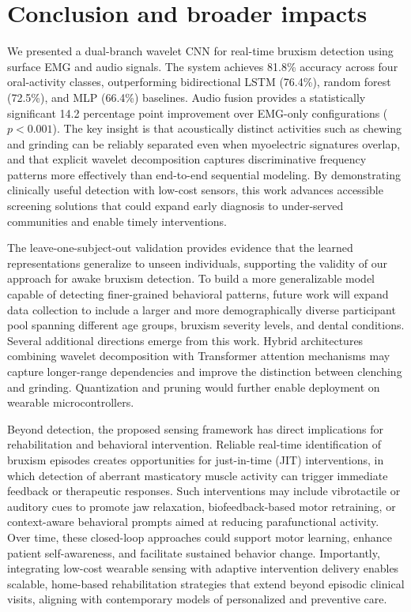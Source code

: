 \documentclass[pdflatex,sn-nature,iicol]{sn-jnl}
\begin{document}
\section{Conclusion and broader impacts}

We presented a dual-branch wavelet CNN for real-time bruxism detection using surface EMG and audio signals. The system achieves 81.8\% accuracy across four oral-activity classes, outperforming bidirectional LSTM (76.4\%), random forest (72.5\%), and MLP (66.4\%) baselines. Audio fusion provides a statistically significant 14.2 percentage point improvement over EMG-only configurations ($p < 0.001$). The key insight is that acoustically distinct activities such as chewing and grinding can be reliably separated even when myoelectric signatures overlap, and that explicit wavelet decomposition captures discriminative frequency patterns more effectively than end-to-end sequential modeling. By demonstrating clinically useful detection with low-cost sensors, this work advances accessible screening solutions that could expand early diagnosis to under-served communities and enable timely interventions.

The leave-one-subject-out validation provides evidence that the learned representations generalize to unseen individuals, supporting the validity of our approach for awake bruxism detection. To build a more generalizable model capable of detecting finer-grained behavioral patterns, future work will expand data collection to include a larger and more demographically diverse participant pool spanning different age groups, bruxism severity levels, and dental conditions. Several additional directions emerge from this work. Hybrid architectures combining wavelet decomposition with Transformer attention mechanisms may capture longer-range dependencies and improve the distinction between clenching and grinding. Quantization and pruning would further enable deployment on wearable microcontrollers.

Beyond detection, the proposed sensing framework has direct implications for rehabilitation and behavioral intervention. Reliable real-time identification of bruxism episodes creates opportunities for just-in-time (JIT) interventions, in which detection of aberrant masticatory muscle activity can trigger immediate feedback or therapeutic responses. Such interventions may include vibrotactile or auditory cues to promote jaw relaxation, biofeedback-based motor retraining, or context-aware behavioral prompts aimed at reducing parafunctional activity. Over time, these closed-loop approaches could support motor learning, enhance patient self-awareness, and facilitate sustained behavior change. Importantly, integrating low-cost wearable sensing with adaptive intervention delivery enables scalable, home-based rehabilitation strategies that extend beyond episodic clinical visits, aligning with contemporary models of personalized and preventive care.
\end{document}
